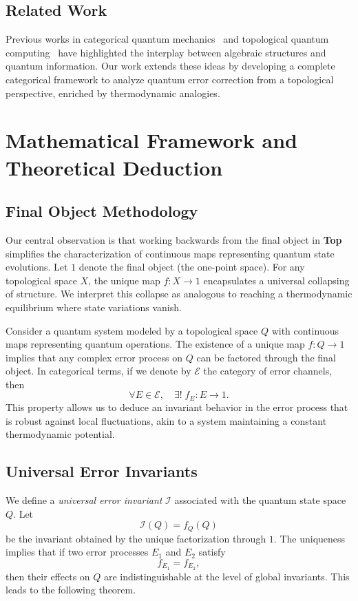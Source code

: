 \documentclass[11pt]{article}
\begin{document}
\subsection{Related Work}
Previous works in categorical quantum mechanics~\cite{AbramskyCoecke2004} and topological quantum computing~\cite{Kitaev2003} have highlighted the interplay between algebraic structures and quantum information. Our work extends these ideas by developing a complete categorical framework to analyze quantum error correction from a topological perspective, enriched by thermodynamic analogies.

\section{Mathematical Framework and Theoretical Deduction}
\label{sec:theory}

\subsection{Final Object Methodology}
Our central observation is that working backwards from the final object in \textbf{Top} simplifies the characterization of continuous maps representing quantum state evolutions. Let \(1\) denote the final object (the one-point space). For any topological space \(X\), the unique map \(f: X \to 1\) encapsulates a universal collapsing of structure. We interpret this collapse as analogous to reaching a thermodynamic equilibrium where state variations vanish.

Consider a quantum system modeled by a topological space \(Q\) with continuous maps representing quantum operations. The existence of a unique map \(f: Q \to 1\) implies that any complex error process on \(Q\) can be factored through the final object. In categorical terms, if we denote by \(\mathcal{E}\) the category of error channels, then
\[
\forall E \in \mathcal{E}, \quad \exists ! \; f_E: E \to 1.
\]
This property allows us to deduce an invariant behavior in the error process that is robust against local fluctuations, akin to a system maintaining a constant thermodynamic potential.

\subsection{Universal Error Invariants}
We define a \emph{universal error invariant} \(\mathcal{I}\) associated with the quantum state space \(Q\). Let
\[
\mathcal{I}(Q) = f_Q(Q)
\]
be the invariant obtained by the unique factorization through \(1\). The uniqueness implies that if two error processes \(E_1\) and \(E_2\) satisfy
\[
f_{E_1} = f_{E_2},
\]
then their effects on \(Q\) are indistinguishable at the level of global invariants. This leads to the following theorem.
\end{document}
